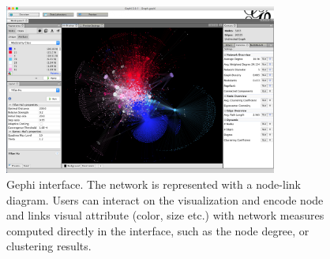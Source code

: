 \begin{figure}
    \centering %
    \includegraphics[width=0.8\textwidth]{static/figures/RelatedWork/Gephi_0.9.1_Network_Analysis_and_Visualization_Software}
    \caption{Gephi \cite{Gephi} interface. The network is represented with a node-link diagram. Users can interact on the visualization and encode node and links visual attribute (color, size etc.) with network measures computed directly in the interface, such as the node degree, or clustering results.}
    \label{fig:gephi}
\end{figure}

